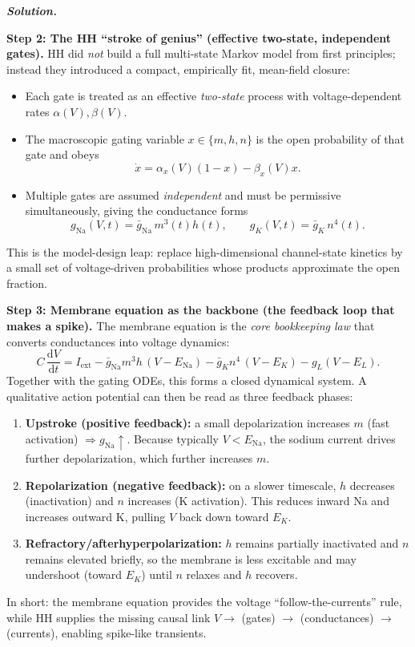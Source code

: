\documentclass{article}
\newif\ifsolutionclearpage
\newenvironment{solution}{%
    \ifsolutionclearpage\clearpage\fi
    \global\solutionclearpagetrue
    \par\noindent\begin{solutionbox}\textbf{\textit{Solution.}}\par\medskip\itshape
}{%
    \end{solutionbox}
}
\renewenvironment{equation}{\begin{equation*}}{\end{equation*}}
\begin{document}
\begin{solution}
\medskip
\textbf{Step 2: The HH ``stroke of genius'' (effective two-state, independent gates).}
HH did \emph{not} build a full multi-state Markov model from first principles; instead they introduced a compact, empirically fit, mean-field closure:
\begin{itemize}
\item Each gate is treated as an effective \emph{two-state} process with voltage-dependent rates $\alpha(V),\beta(V)$.
\item The macroscopic gating variable $x\in\{m,h,n\}$ is the open probability of that gate and obeys
\begin{equation}
\dot x=\alpha_x(V)(1-x)-\beta_x(V)x.
\end{equation}
\item Multiple gates are assumed \emph{independent} and must be permissive simultaneously, giving the conductance forms
\begin{equation}
g_{\mathrm{Na}}(V,t)=\bar g_{\mathrm{Na}}\,m^3(t)h(t),
\qquad
g_K(V,t)=\bar g_K\,n^4(t).
\end{equation}
\end{itemize}
This is the model-design leap: replace high-dimensional channel-state kinetics by a small set of voltage-driven probabilities whose products approximate the open fraction.

\medskip
\textbf{Step 3: Membrane equation as the backbone (the feedback loop that makes a spike).}
The membrane equation is the \emph{core bookkeeping law} that converts conductances into voltage dynamics:
\begin{equation}
C\,\frac{\mathrm dV}{\mathrm dt}
= I_{\mathrm{ext}}
- \bar g_{\mathrm{Na}} m^3 h\,(V-E_{\mathrm{Na}})
- \bar g_K n^4\,(V-E_K)
- g_L (V-E_L).
\end{equation}
Together with the gating ODEs, this forms a closed dynamical system. A qualitative action potential can then be read as three feedback phases:
\begin{enumerate}
\item \textbf{Upstroke (positive feedback):} a small depolarization increases $m$ (fast activation) $\Rightarrow g_{\mathrm{Na}}\uparrow$.
Because typically $V<E_{\mathrm{Na}}$, the sodium current drives further depolarization, which further increases $m$.
\item \textbf{Repolarization (negative feedback):} on a slower timescale, $h$ decreases (inactivation) and $n$ increases (K activation).
This reduces inward Na and increases outward K, pulling $V$ back down toward $E_K$.
\item \textbf{Refractory/afterhyperpolarization:} $h$ remains partially inactivated and $n$ remains elevated briefly, so the membrane is less excitable and may undershoot (toward $E_K$) until $n$ relaxes and $h$ recovers.
\end{enumerate}
In short: the membrane equation provides the voltage ``follow-the-currents'' rule, while HH supplies the missing causal link $V\to$ (gates) $\to$ (conductances) $\to$ (currents), enabling spike-like transients.
\end{solution}
\end{document}
